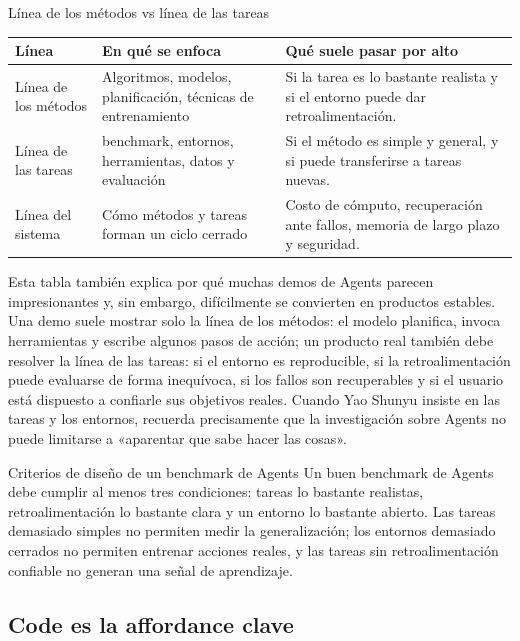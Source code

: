 \documentclass[a4paper]{article}
\begin{document}
\begin{knowledgebox}{Línea de los métodos vs línea de las tareas}
\begin{tabularx}{\textwidth}{p{}p{}X}
\toprule
Línea & En qué se enfoca & Qué suele pasar por alto \\
\midrule
Línea de los métodos & Algoritmos, modelos, planificación, técnicas de entrenamiento & Si la tarea es lo bastante realista y si el entorno puede dar retroalimentación. \\
Línea de las tareas & benchmark, entornos, herramientas, datos y evaluación & Si el método es simple y general, y si puede transferirse a tareas nuevas. \\
Línea del sistema & Cómo métodos y tareas forman un ciclo cerrado & Costo de cómputo, recuperación ante fallos, memoria de largo plazo y seguridad. \\
\bottomrule
\end{tabularx}
\end{knowledgebox}

Esta tabla también explica por qué muchas demos de Agents parecen impresionantes y, sin embargo, difícilmente se convierten en productos estables. Una demo suele mostrar solo la línea de los métodos: el modelo planifica, invoca herramientas y escribe algunos pasos de acción; un producto real también debe resolver la línea de las tareas: si el entorno es reproducible, si la retroalimentación puede evaluarse de forma inequívoca, si los fallos son recuperables y si el usuario está dispuesto a confiarle sus objetivos reales. Cuando Yao Shunyu insiste en las tareas y los entornos, recuerda precisamente que la investigación sobre Agents no puede limitarse a «aparentar que sabe hacer las cosas».

\begin{importantbox}{Criterios de diseño de un benchmark de Agents}
Un buen benchmark de Agents debe cumplir al menos tres condiciones: tareas lo bastante realistas, retroalimentación lo bastante clara y un entorno lo bastante abierto. Las tareas demasiado simples no permiten medir la generalización; los entornos demasiado cerrados no permiten entrenar acciones reales, y las tareas sin retroalimentación confiable no generan una señal de aprendizaje.
\end{importantbox}

\subsection{Code es la affordance clave}
\end{document}
